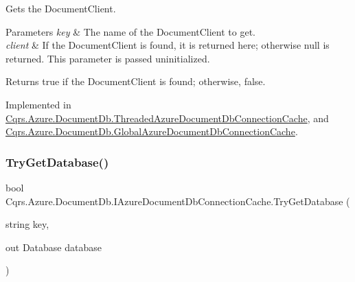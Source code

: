 Gets the Document\+Client. 


\begin{DoxyParams}{Parameters}
{\em key} & The name of the Document\+Client to get.\\
\hline
{\em client} & If the Document\+Client is found, it is returned here; otherwise null is returned. This parameter is passed uninitialized.\\
\hline
\end{DoxyParams}
\begin{DoxyReturn}{Returns}
true if the Document\+Client is found; otherwise, false.
\end{DoxyReturn}


Implemented in \hyperlink{classCqrs_1_1Azure_1_1DocumentDb_1_1ThreadedAzureDocumentDbConnectionCache_a0cf4a79ec6bcc1021182f95ddc27edea_a0cf4a79ec6bcc1021182f95ddc27edea}{Cqrs.\+Azure.\+Document\+Db.\+Threaded\+Azure\+Document\+Db\+Connection\+Cache}, and \hyperlink{classCqrs_1_1Azure_1_1DocumentDb_1_1GlobalAzureDocumentDbConnectionCache_a5b91ecf67ee594a0a6a4d3193f381c6e_a5b91ecf67ee594a0a6a4d3193f381c6e}{Cqrs.\+Azure.\+Document\+Db.\+Global\+Azure\+Document\+Db\+Connection\+Cache}.

\mbox{\label{interfaceCqrs_1_1Azure_1_1DocumentDb_1_1IAzureDocumentDbConnectionCache_ac2ab3e4a1c093f10d0b55634d4990ab2_ac2ab3e4a1c093f10d0b55634d4990ab2}} 
\subsubsection{\texorpdfstring{Try\+Get\+Database()}{TryGetDatabase()}}
{\footnotesize\ttfamily bool Cqrs.\+Azure.\+Document\+Db.\+I\+Azure\+Document\+Db\+Connection\+Cache.\+Try\+Get\+Database (\begin{DoxyParamCaption}\item[{string}]{key,  }\item[{out Database}]{database }\end{DoxyParamCaption})}



